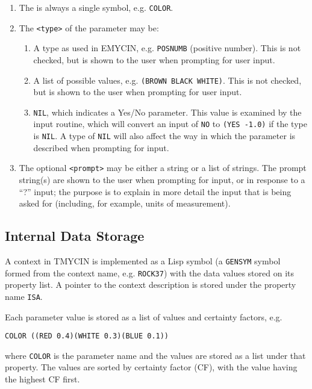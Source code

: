 \begin{enumerate}
\item The {\tt <parameter-name>} is always a single symbol, e.g. {\tt COLOR}.

\item The {\tt <type>} of the parameter may be:
\begin{enumerate}
\item A type as used in EMYCIN, e.g. {\tt POSNUMB} (positive number).  This is
not checked, but is shown to the user when prompting for user input.

\item A list of possible values, e.g. {\tt (BROWN BLACK WHITE)}.  This is
not checked, but is shown to the user when prompting for user input.

\item {\tt NIL}, which indicates a Yes/No parameter.  This value is examined by
the input routine, which will convert an input of {\tt NO} to {\tt (YES\ -1.0)}
if the type is {\tt NIL}.  A type of {\tt NIL} will also affect the way in
which the parameter is described when prompting for input.
\end{enumerate}

\item The optional {\tt <prompt>} may be either a string or a list of strings.
The prompt string(s) are shown to the user when prompting for input, or in
response to a ``?'' input; the purpose is to explain in more detail the
input that is being asked for (including, for example, units of measurement).
\end{enumerate}

\subsection{Internal Data Storage}

A context in TMYCIN is implemented as a Lisp symbol (a {\tt GENSYM} symbol
formed from the context name, e.g. {\tt ROCK37}) with the data values
stored on its property list.  A pointer to the context description is stored
under the property name {\tt ISA}.

Each parameter value is stored as a list of values and certainty factors, e.g.

\begin{verbatim}
COLOR ((RED 0.4)(WHITE 0.3)(BLUE 0.1))
\end{verbatim}

where {\tt COLOR} is the parameter name and the values are stored as
a list under that property.  The values are sorted by certainty factor (CF),
with the value having the highest CF first.


